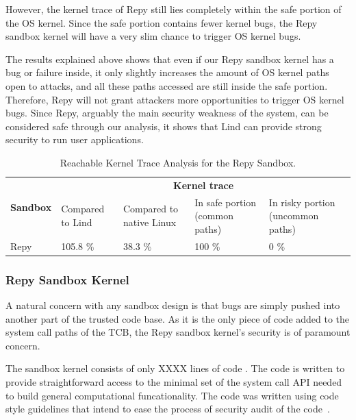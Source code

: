 However, the kernel trace of Repy still lies completely within the safe
portion of the OS kernel.
Since the safe portion contains fewer kernel bugs, the Repy sandbox kernel
will have a very slim chance to trigger OS kernel bugs.

The results explained above shows that even if our Repy sandbox kernel has a
bug or failure inside,
it only slightly increases the amount of OS kernel paths open to attacks,
and all these paths accessed are still inside the safe portion.
Therefore, Repy will not grant attackers more opportunities to trigger OS
kernel bugs.
Since Repy, arguably the main security weakness of the system, can be
considered safe through our analysis,
it shows that Lind can provide strong security to run user applications.

\begin{table}
\centering
\scriptsize
\caption{Reachable Kernel Trace Analysis for the Repy Sandbox. }
\begin{tabular}{|l|l|l|l|l|}
  \hline
  \multirow{3}{.8cm}{\bf Sandbox} & \multicolumn{4}{c|}{\bf Kernel trace} \\ \cline{2-5}
  & \multirow{2}{1cm}{Compared to Lind} &
  \multirow{2}{1.3cm}{Compared to native Linux} & \multirow{2}{1.7cm}{In safe portion
  (common paths)} & \multirow{2}{1.9cm}{In risky portion (uncommon paths)} \\
  & & & & \\  \hline

  Repy & 105.8 \% & 38.3 \% & 100 \%  & 0 \%  \\
  \hline
\end{tabular}
\label{table:trace-Repy}
\end{table}


\subsubsection{Repy Sandbox Kernel}
\label{Sandbox-Kernel-Bugs}

A natural concern with any sandbox design is that bugs are simply pushed into
another part of the trusted code base.  As it is the only piece of code added
to the system call paths of the TCB, the Repy sandbox kernel's security is of
paramount concern.

The sandbox kernel consists of only XXXX lines of code .
The code is written to provide straightforward access to the minimal set
of the system call API needed to build general computational funcationality.
The code was written using code style guidelines that intend to ease the
process of security audit of the code~\cite{style}.

